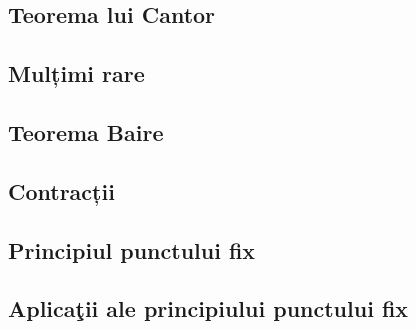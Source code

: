 \documentclass[a4paper,12pt]{article}
\theoremstyle{change}
\begin{document}

\subsection{Teorema lui Cantor}

\subsection{Mulțimi rare}

\subsection{Teorema Baire}


\subsection{Contracții}

\subsection{Principiul punctului fix}

\subsection{Aplicaţii ale principiului  punctului fix}
\end{document}
